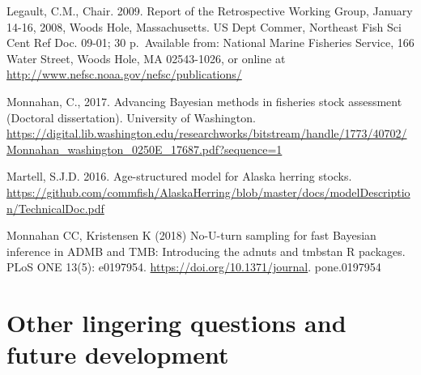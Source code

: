 \documentclass[]{article}
\begin{document}
Legault, C.M., Chair. 2009. Report of the Retrospective Working Group,
January 14-16, 2008, Woods Hole, Massachusetts. US Dept Commer,
Northeast Fish Sci Cent Ref Doc. 09-01; 30 p.~Available from: National
Marine Fisheries Service, 166 Water Street, Woods Hole, MA 02543-1026,
or online at \url{http://www.nefsc.noaa.gov/nefsc/publications/}

Monnahan, C., 2017. Advancing Bayesian methods in fisheries stock
assessment (Doctoral dissertation). University of Washington.
\url{https://digital.lib.washington.edu/researchworks/bitstream/handle/1773/40702/Monnahan_washington_0250E_17687.pdf?sequence=1}

Martell, S.J.D. 2016. Age-structured model for Alaska herring stocks.
\url{https://github.com/commfish/AlaskaHerring/blob/master/docs/modelDescription/TechnicalDoc.pdf}

Monnahan CC, Kristensen K (2018) No-U-turn sampling for fast Bayesian
inference in ADMB and TMB: Introducing the adnuts and tmbstan R
packages. PLoS ONE 13(5): e0197954.
\url{https://doi.org/10.1371/journal}. pone.0197954

\section{Other lingering questions and future
development}\label{other-lingering-questions-and-future-development}
\end{document}
